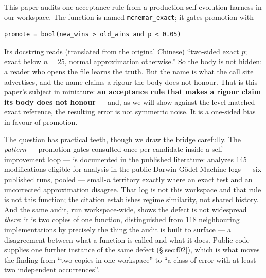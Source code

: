\documentclass[10pt]{article}
\newcommand{\code}[1]{\texttt{#1}}
\begin{document}
This paper audits one acceptance rule from a production self-evolution harness
in our workspace. The function is named \code{mcnemar\_exact}; it gates
promotion with

\begin{verbatim}
promote = bool(new_wins > old_wins and p < 0.05)
\end{verbatim}

Its docstring reads (translated from the original Chinese) ``two-sided exact
$p$; exact below $n{=}25$, normal approximation otherwise.'' So the body
is not hidden: a reader who opens the file learns the truth. But the name is
what the call site advertises, and the name claims a rigour the body does not
honour. That is this paper's subject in miniature: \textbf{an acceptance rule
that makes a rigour claim its body does not honour} --- and, as we will show
against the level-matched exact reference, the resulting error is not
symmetric noise. It is a one-sided bias in favour of promotion.

The question has practical teeth, though we draw the bridge carefully. The
\emph{pattern} --- promotion gates consulted once per candidate inside a
self-improvement loop --- is documented in the published literature:
\citep{he2026failure} analyzes 145 modifications eligible for analysis in
the public Darwin Gödel Machine logs --- six published runs, pooled ---
small-$n$ territory exactly where an exact test
and an uncorrected approximation disagree. That log is not this workspace and
that rule is not this function; the citation establishes regime similarity,
not shared history. And the same audit, run workspace-wide, shows the defect
is not widespread \emph{there}: it is two copies of one function, distinguished
from 118 neighbouring implementations by precisely the thing the audit is
built to surface --- a disagreement between what a function is called and what
it does. Public code supplies one further instance of the same defect
(\S\ref{sec:f02}), which is what moves the finding from ``two copies in one
workspace'' to ``a class of error with at least two independent occurrences''.
\end{document}
